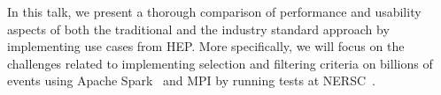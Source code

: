 In this talk, we present a thorough comparison of performance and usability aspects of 
both the traditional and the industry standard approach by implementing use cases from HEP.  
More specifically, we will focus on the challenges related to implementing selection and 
filtering criteria on billions of events using Apache Spark~\cite{spark,spark1} and MPI by running tests at NERSC~\cite{nersc-spark}. 
